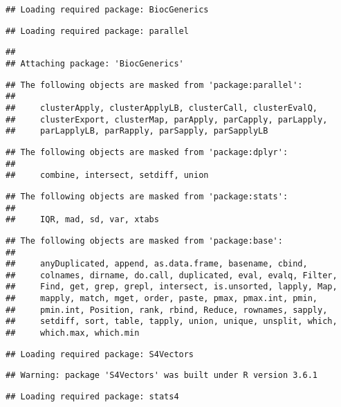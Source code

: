 \documentclass[]{article}
\begin{document}
\begin{verbatim}
## Loading required package: BiocGenerics
\end{verbatim}

\begin{verbatim}
## Loading required package: parallel
\end{verbatim}

\begin{verbatim}
## 
## Attaching package: 'BiocGenerics'
\end{verbatim}

\begin{verbatim}
## The following objects are masked from 'package:parallel':
## 
##     clusterApply, clusterApplyLB, clusterCall, clusterEvalQ,
##     clusterExport, clusterMap, parApply, parCapply, parLapply,
##     parLapplyLB, parRapply, parSapply, parSapplyLB
\end{verbatim}

\begin{verbatim}
## The following objects are masked from 'package:dplyr':
## 
##     combine, intersect, setdiff, union
\end{verbatim}

\begin{verbatim}
## The following objects are masked from 'package:stats':
## 
##     IQR, mad, sd, var, xtabs
\end{verbatim}

\begin{verbatim}
## The following objects are masked from 'package:base':
## 
##     anyDuplicated, append, as.data.frame, basename, cbind,
##     colnames, dirname, do.call, duplicated, eval, evalq, Filter,
##     Find, get, grep, grepl, intersect, is.unsorted, lapply, Map,
##     mapply, match, mget, order, paste, pmax, pmax.int, pmin,
##     pmin.int, Position, rank, rbind, Reduce, rownames, sapply,
##     setdiff, sort, table, tapply, union, unique, unsplit, which,
##     which.max, which.min
\end{verbatim}

\begin{verbatim}
## Loading required package: S4Vectors
\end{verbatim}

\begin{verbatim}
## Warning: package 'S4Vectors' was built under R version 3.6.1
\end{verbatim}

\begin{verbatim}
## Loading required package: stats4
\end{verbatim}
\end{document}
